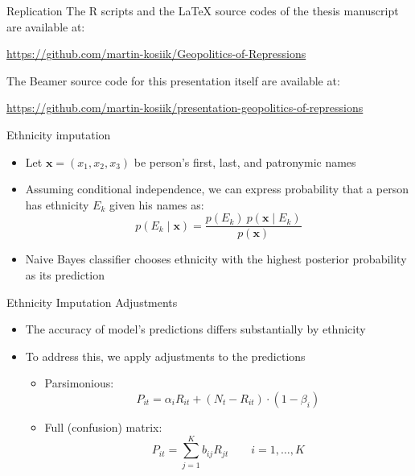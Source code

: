 \documentclass[11pt]{beamer}
\begin{document}
\begin{frame}{Replication}
The R scripts and the LaTeX source codes of the thesis manuscript are available at:
  \begin{center}\url{https://github.com/martin-kosiik/Geopolitics-of-Repressions}\end{center}

The Beamer source code for this presentation itself are available at: 
\begin{center}\url{https://github.com/martin-kosiik/presentation-geopolitics-of-repressions}\end{center}
\end{frame}



\begin{frame}[label=ethnicity_imputation]{Ethnicity imputation}
\begin{itemize}
    \item Let  $\boldsymbol{x} = \left(x_1, x_2, x_3\right)$ be person's first, last, and patronymic names
    \item Assuming conditional independence, we can express probability that a person has ethnicity $E_k$ given his names as:
    \begin{equation*}
p(E_k \mid \mathbf{x}) = \frac{p(E_k) \ p(\mathbf{x} \mid E_k)}{p(\mathbf{x})}
\end{equation*}
    \item Naive Bayes classifier chooses ethnicity with the highest posterior probability as its prediction

\end{itemize}
\hyperlink{data}{}
\end{frame}

\begin{frame}[label=ethnicity_imputation_adj]{Ethnicity Imputation Adjustments}
\begin{itemize}
    \item The accuracy of model's predictions differs substantially by ethnicity 
    \item To address this, we apply  adjustments to the predictions
    \begin{itemize}
        \item Parsimonious: 
        \begin{equation*}
    P_{it} = \alpha_i R_{it} + \left( N_t - R_{it} \right) \cdot \left(1 - \beta_i \right)  
\end{equation*}
 \item Full (confusion) matrix:
 \begin{equation*}
P_{it}  = \sum_{j = 1}^{K} b_{ij} R_{jt} \qquad i = 1, \dots, K
\end{equation*}
    \end{itemize}
    
\end{itemize}
\hyperlink{data}{}
\end{frame}
\end{document}
